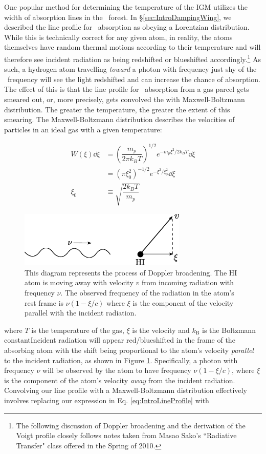 One popular method for determining the temperature of the IGM utilizes the width of absorption lines in the \lya\ forest. In \S \ref{sec:IntroDampingWing}, we described the line profile for \lya\ absorption as obeying a Lorentzian distribution. While this is technically correct for any given atom, in reality, the atoms themselves have random thermal motions according to their temperature and will therefore see incident radiation as being redshifted or blueshifted accordingly.\footnote{The following discussion of Doppler broadening and the derivation of the Voigt profile closely follows notes taken from Masao Sako's ``Radiative Transfer" class offered in the Spring of 2010.}  As such, a hydrogen atom travelling \textit{toward} a photon with frequency just shy of the \lya\ frequency will see the light redshifted and can increase the chance of absorption. The effect of this is that the line profile for \lya\ absorption from a gas parcel gets smeared out, or, more precisely, gets convolved the with Maxwell-Boltzmann distribution. The greater the temperature, the greater the extent of this smearing. The Maxwell-Boltzmann distribution describes the velocities of particles in an ideal gas with a given temperature:


\begin{align}
W(\xi)\dd \xi &= \left( \dfrac{m_p}{2\pi k_{B}T} \right)^{1/2}e^{-m_p\xi^2/2 k_B T}\dd \xi \\
&= \left(\pi \xi_{0}^{2} \right)^{-1/2} e^{-\xi^{2}/\xi_{0}^{2}} \dd \xi \\
\xi_{0} &\equiv \sqrt{ \dfrac{2k_B T}{m_p}}
\end{align}


\begin{figure}[!p]
  \centering
  \includegraphics[width=8cm]{dopplerDiagram.eps}
  \caption{This diagram represents the process of Doppler broadening. The HI atom is moving away with velocity $v$ from incoming radiation with frequency $\nu$. The observed frequency of the radiation in the atom's rest frame is $\nu(1-\xi/c)$ where $\xi$ is the component of the velocity parallel with the incident radiation. }
  \label{fig:dopplerDiagram}
\end{figure}


where $T$ is the temperature of the gas, $\xi$ is the velocity and $k_{\text{B}}$ is the Boltzmann constantIncident radiation will appear red/blueshifted in the frame of the absorbing atom with the shift being proportional to the atom's velocity \textit{parallel} to the incident radiation, as shown in Figure \ref{fig:dopplerDiagram}. Specifically, a photon with frequency $\nu$ will be observed by the atom to have frequency $\nu(1-\xi/c)$, where $\xi$ is the component of the atom's velocity \textit{away} from the incident radiation. Convolving our line profile with a Maxwell-Boltzmann distribution effectively involves replacing our expression in Eq. \ref{eq:IntroLineProfile} with

